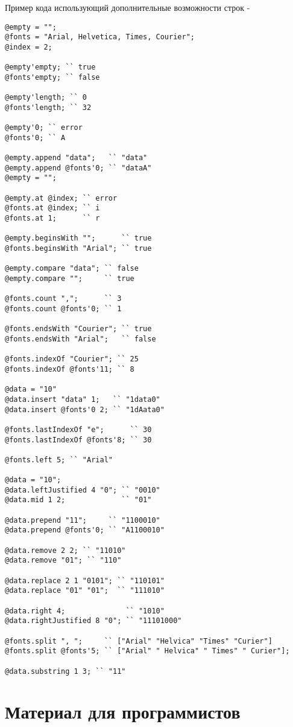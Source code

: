 \documentclass[a4paper, 14pt]{extarticle}
\begin{document}
\noindent Пример кода использующий дополнительные возможности строк -
\begin{lstlisting}
@empty = "";
@fonts = "Arial, Helvetica, Times, Courier";
@index = 2;

@empty'empty; `` true
@fonts'empty; `` false

@empty'length; `` 0
@fonts'length; `` 32

@empty'0; `` error
@fonts'0; `` A

@empty.append "data";   `` "data"
@empty.append @fonts'0; `` "dataA"
@empty = "";

@empty.at @index; `` error
@fonts.at @index; `` i
@fonts.at 1;	  `` r

@empty.beginsWith "";      `` true
@fonts.beginsWith "Arial"; `` true

@empty.compare "data"; `` false
@empty.compare "";     `` true

@fonts.count ",";      `` 3
@fonts.count @fonts'0; `` 1

@fonts.endsWith "Courier"; `` true
@fonts.endsWith "Arial";   `` false

@fonts.indexOf "Courier"; `` 25
@fonts.indexOf @fonts'11; `` 8

@data = "10"
@data.insert "data" 1;   `` "1data0"
@data.insert @fonts'0 2; `` "1dAata0"

@fonts.lastIndexOf "e";      `` 30
@fonts.lastIndexOf @fonts'8; `` 30

@fonts.left 5; `` "Arial"

@data = "10";
@data.leftJustified 4 "0"; `` "0010"
@data.mid 1 2;             `` "01"

@data.prepend "11";     `` "1100010"
@data.prepend @fonts'0; `` "A1100010"

@data.remove 2 2; `` "11010"
@data.remove "01"; `` "110"

@data.replace 2 1 "0101"; `` "110101"
@data.replace "01" "01";  `` "111010"

@data.right 4; 				`` "1010"
@data.rightJustified 8 "0"; `` "11101000"

@fonts.split ", ";     `` ["Arial" "Helvica" "Times" "Curier"]
@fonts.split @fonts'5; `` ["Arial" " Helvica" " Times" " Curier"];

@data.substring 1 3; `` "11"
\end{lstlisting}

\newpage
\part{Материал для программистов}
\end{document}
